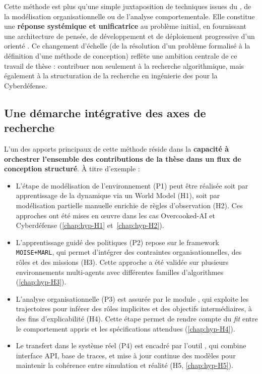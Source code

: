 Cette méthode est plus qu'une simple juxtaposition de techniques issues du , de la modélisation organisationnelle ou de l'analyse comportementale. Elle constitue une \textbf{réponse systémique et unificatrice} au problème initial, en fournissant une architecture de pensée, de développement et de déploiement progressive d'un  orienté . Ce changement d'échelle (de la résolution d'un problème formalisé à la définition d'une méthode de conception) reflète une ambition centrale de ce travail de thèse : contribuer non seulement à la recherche algorithmique, mais également à la structuration de la recherche en ingénierie des  pour la Cyberdéfense.

\subsection{Une démarche intégrative des axes de recherche}
L'un des apports principaux de cette méthode réside dans la \textbf{capacité à orchestrer l'ensemble des contributions de la thèse dans un flux de conception structuré}. À titre d'exemple :

\begin{itemize}
    \item L'étape de modélisation de l'environnement (P1) peut être réalisée soit par apprentissage de la dynamique via un World Model (H1), soit par modélisation partielle manuelle enrichie de règles d'observation (H2). Ces approches ont été mises en œuvre dans les cas Overcooked-AI et Cyberdéfense (\autoref{chap:hyp-H1} et~\autoref{chap:hyp-H2}).

    \item L'apprentissage guidé des politiques (P2) repose sur le framework \texttt{MOISE+MARL}, qui permet d'intégrer des contraintes organisationnelles, des rôles et des missions (H3). Cette approche a été validée sur plusieurs environnements multi-agents avec différentes familles d'algorithmes (\autoref{chap:hyp-H3}).

    \item L'analyse organisationnelle (P3) est assurée par le module , qui exploite les trajectoires pour inférer des rôles implicites et des objectifs intermédiaires, à des fins d'explicabilité (H4). Cette étape permet de rendre compte du \textit{fit} entre le comportement appris et les spécifications attendues (\autoref{chap:hyp-H4}).

    \item Le transfert dans le système réel (P4) est encadré par l'outil , qui combine interface API, base de traces, et mise à jour continue des modèles pour maintenir la cohérence entre simulation et réalité (H5, \autoref{chap:hyp-H5}).
\end{itemize}

